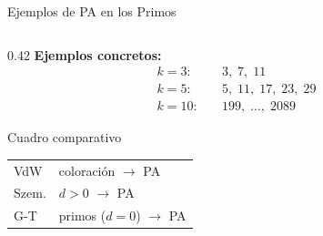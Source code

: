 \begin{frame}{Ejemplos de PA en los Primos}
\begin{columns}[T]
        \begin{column}{0.42\textwidth}
            \textbf{Ejemplos concretos:}
            \begin{align*}
                k=3\colon &\quad 3,\;7,\;11 \\[3pt]
                k=5\colon &\quad 5,\;11,\;17,\;23,\;29 \\[3pt]
                k=10\colon &\quad 199,\;\ldots,\;2089
            \end{align*}

            \vspace{0.3cm}

            \begin{block}{Cuadro comparativo}
            {\footnotesize
            \begin{tabular}{ll}
                \hline
                VdW     & coloración $\to$ PA \\
                Szem.   & $d>0$ $\to$ PA \\
                G-T     & primos ($d=0$) $\to$ PA \\
                \hline
            \end{tabular}}
            \end{block}
        \end{column}

    \end{columns}

\end{frame}


